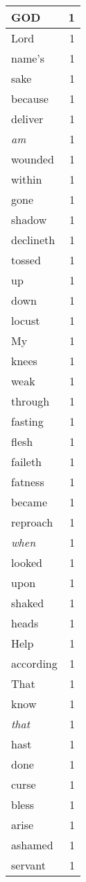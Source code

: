 \begin{center}
\begin{longtable}{l|r}
GOD & 1 \\ \hline
Lord & 1 \\ \hline
name's & 1 \\ \hline
sake & 1 \\ \hline
because & 1 \\ \hline
deliver & 1 \\ \hline
\emph{am} & 1 \\ \hline
wounded & 1 \\ \hline
within & 1 \\ \hline
gone & 1 \\ \hline
shadow & 1 \\ \hline
declineth & 1 \\ \hline
tossed & 1 \\ \hline
up & 1 \\ \hline
down & 1 \\ \hline
locust & 1 \\ \hline
My & 1 \\ \hline
knees & 1 \\ \hline
weak & 1 \\ \hline
through & 1 \\ \hline
fasting & 1 \\ \hline
flesh & 1 \\ \hline
faileth & 1 \\ \hline
fatness & 1 \\ \hline
became & 1 \\ \hline
reproach & 1 \\ \hline
\emph{when} & 1 \\ \hline
looked & 1 \\ \hline
upon & 1 \\ \hline
shaked & 1 \\ \hline
heads & 1 \\ \hline
Help & 1 \\ \hline
according & 1 \\ \hline
That & 1 \\ \hline
know & 1 \\ \hline
\emph{that} & 1 \\ \hline
hast & 1 \\ \hline
done & 1 \\ \hline
curse & 1 \\ \hline
bless & 1 \\ \hline
arise & 1 \\ \hline
ashamed & 1 \\ \hline
servant & 1 \\ \hline

\end{longtable}
\end{center}
